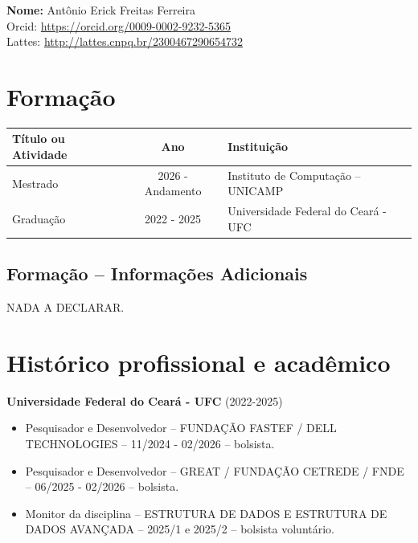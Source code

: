 \documentclass[11pt]{article}
\begin{document}
\hspace{-0.7cm} \textbf{Nome:} Antônio Erick Freitas Ferreira\\
\hspace{-0.6cm} Orcid: \url{https://orcid.org/0009-0002-9232-5365} \\
\hspace{-0.6cm} Lattes: \url{http://lattes.cnpq.br/2300467290654732} \\

\section{Formação}

\hspace{-1cm}
\begin{tabular}{p{4cm} c p{10cm}}
	\textbf{Título ou Atividade} & \textbf{Ano} & \textbf{Instituição} \\ \hline
	Mestrado & 2026 - Andamento & Instituto de Computação – UNICAMP \\	
	Graduação & 2022 - 2025 & Universidade Federal do Ceará - UFC \\
\end{tabular}

\vspace{0.3\baselineskip}
\subsection{Formação -- Informações Adicionais}
NADA A DECLARAR.


\section{Histórico profissional e acadêmico}

\textbf{Universidade Federal do Ceará - UFC} (2022-2025) \\

\begin{itemize}

    \item Pesquisador e Desenvolvedor -- FUNDAÇÃO FASTEF / DELL TECHNOLOGIES -- 11/2024 - 02/2026 -- bolsista.
    
    \item Pesquisador e Desenvolvedor -- GREAT / FUNDAÇÃO CETREDE / FNDE -- 06/2025 - 02/2026 -- bolsista.
    
    \item Monitor da disciplina -- ESTRUTURA DE DADOS E ESTRUTURA DE DADOS AVANÇADA -- 2025/1 e 2025/2 -- bolsista voluntário.
 
\end{itemize}
\end{document}
